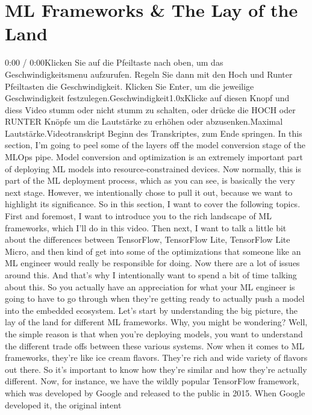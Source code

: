 {{{{{\section{ML Frameworks \& The Lay of the Land}
    0:00 / 0:00Klicken Sie auf die Pfeiltaste nach oben, um das Geschwindigkeitsmenu aufzurufen. Regeln Sie dann mit den Hoch und Runter Pfeiltasten die Geschwindigkeit. Klicken Sie Enter, um die jeweilige Geschwindigkeit festzulegen.Geschwindigkeit1.0xKlicke auf diesen Knopf und diess Video stumm oder nicht stumm zu schalten, oder drücke die HOCH oder RUNTER Knöpfe um die Lautstärke zu erhöhen oder abzusenken.Maximal Lautstärke.Videotranskript
    Beginn des Transkriptes, zum Ende springen.
    In this section, I'm going to peel some of the layers
    off the model conversion stage of the MLOps pipe.
    Model conversion and optimization is an extremely important part
    of deploying ML models into resource-constrained devices.
    Now normally, this is part of the ML deployment
    process, which as you can see, is basically the very next stage.
    However, we intentionally chose to pull it out,
    because we want to highlight its significance.
    So in this section, I want to cover the following topics.
    First and foremost, I want to introduce you
    to the rich landscape of ML frameworks, which I'll do in this video.
    Then next, I want to talk a little bit about the differences
    between TensorFlow, TensorFlow Lite, TensorFlow Lite Micro, and then kind
    of get into some of the optimizations that someone like an ML engineer
    would really be responsible for doing.
    Now there are a lot of issues around this.
    And that's why I intentionally want to spend a bit of time talking about this.
    So you actually have an appreciation for what your ML engineer is
    going to have to go through when they're getting ready to actually push
    a model into the embedded ecosystem.
    Let's start by understanding the big picture,
    the lay of the land for different ML frameworks.
    Why, you might be wondering?
    Well, the simple reason is that when you're deploying models,
    you want to understand the different trade
    offs between these various systems.
    Now when it comes to ML frameworks, they're like ice cream flavors.
    They're rich and wide variety of flavors out there.
    So it's important to know how they're similar
    and how they're actually different.
    Now, for instance, we have the wildly popular TensorFlow framework,
    which was developed by Google and released to the public in 2015.
    When Google developed it, the original intent
}}}}}
